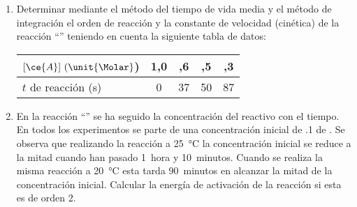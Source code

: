 \begin{enumerate}
	\item Determinar mediante el método del tiempo de vida media y el método de integración el orden de reacción y la constante de velocidad (cinética) de la reacción ``'' teniendo en cuenta la siguiente tabla de datos:
	\begin{center}
		\begin{tabular}{l|SSSS}
				$[\ce{A}]~(\unit{\Molar}$)			&	1,0		&	  ,6	&	  ,5	&	  ,3	\\
			\midrule
				$t$ de reacción (\unit{\second})	&	0		&	37		&	50		&	87
		\end{tabular}
	\end{center}
	\item En la reacción ``'' se ha seguido la concentración del reactivo  con el tiempo. En todos los experimentos se parte de una concentración inicial de \SI{,1}{\Molar} de . Se observa que realizando la reacción a \SI{25}{\celsius} la concentración inicial se reduce a la mitad cuando han pasado \SI{1}{hora} y \SI{10}{minutos}. Cuando se realiza la misma reacción a \SI{20}{\celsius} esta tarda \SI{90}{minutos} en alcanzar la mitad de la concentración inicial. Calcular la energía de activación de la reacción si esta es de orden 2.
\end{enumerate}

